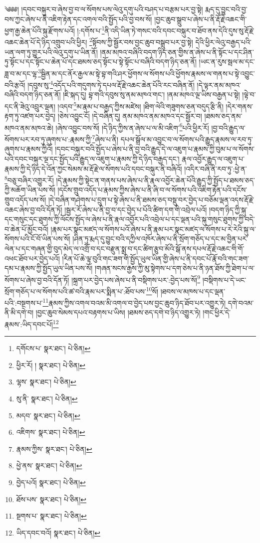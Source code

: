 \setcounter{footnote}{0} 
༄༅༅། །དབང་བསྐུར་བ་ཞེས་བྱ་བ་ལ་སོགས་པས་ལེའུ་དགུ་པའི་བཤད་པ་བརྩམ་པར་བྱ་སྟེ། རྨད་དུ་བྱུང་བའི་བྱ་བས་ཀྱང་ཞེས་པ་ནི་འཇིག་རྟེན་དང་འགལ་བའི་སྤྱོད་པའི་བྱ་བས་སོ། །བྱང་ཆུབ་སྒྲུབ་པ་ཞེས་པ་ནི་རྡོ་རྗེ་འཆང་གི་ཕྱག་རྒྱ་ཆེན་པོའི་སྐུ་རྫོགས་པའོ། །:དགོས་པ་\footnote{དགོངས་པ་  སྣར་ཐང་།  པེ་ཅིན། }ནི་འདི་ཡིན་ཏེ་གསང་བའི་དབང་བསྐུར་བ་ཐོབ་ནས་དེའི་དུས་སུ་རྡོ་རྗེ་འཆང་ཆེན་པོ་དེ་ཉིད་འགྲུབ་པའི་ཕྱིར། \footnote{ཕྱིར་རོ། །   སྣར་ཐང་།  པེ་ཅིན། }སྟོབས་ཀྱི་སྦྱོར་བས་བྱང་ཆུབ་བསྒྲུབ་པར་བྱ་སྟེ། དེའི་ཕྱིར་ལེའུ་བརྒྱད་པའི་ཡན་ལག་ཏུ་གྱུར་པའི་ལེའུ་དགུ་པ་ཡིན་ནོ། །ནམ་མཁའ་བཞིའི་བདག་ཉིད་ཅན་གྱིས་ན་ཞེས་པ་ནི་སྟོང་པ་དང་ཤིན་ཏུ་སྟོང་པ་དང་སྟོང་པ་ཆེན་པོ་དང་ཐམས་ཅད་སྟོང་པ་སྟེ་སྟོང་པ་བཞིའི་བདག་ཉིད་ཅན་ནོ། །ཡང་ན་རུས་སྦལ་མ་དང་ཟླ་བ་མ་དང་ལྷ་\footnote{ལྷས་  སྣར་ཐང་།  པེ་ཅིན། }སྦྱིན་མ་དང་ནོར་རྒྱལ་མ་སྟེ་བྷ་གའི་ཤར་ཕྱོགས་ལ་སོགས་པའི་ཕྱོགས་རྣམས་ལ་གནས་པ་སྟེ་འབྱུང་བའི་རྩའོ། །དབུས་སུ་\footnote{སུ་ནི་  སྣར་ཐང་།  པེ་ཅིན། }འདོད་པའི་གདུགས་ཏེ་དཔལ་རྡོ་རྗེ་འཆང་ཆེན་པོའི་རང་བཞིན་ནོ། །དེ་ལྟར་ནམ་མཁའ་བཞིའི་བདག་ཉིད་ཅན་ནོ། །ཇི་སྐད་དུ། བྷ་གའི་དབུས་སུ་ནམ་མཁའ་གང་། །ནམ་མཁའ་ལྔ་ཡིས་བརྒྱན་པ་སྟེ། །ལྟེ་བ་དང་ནི་ཟེའུ་འབྲུར་ལྡན། །འདབ་\footnote{མདབ་  སྣར་ཐང་།  པེ་ཅིན། }མ་རྣམ་པ་བརྒྱད་ཀྱིས་མཛེས། །ཐིག་ལེའི་གཟུགས་ཅན་བདུད་རྩི་ནི། །དེར་གནས་རྟག་ཏུ་འཛག་པར་བྱེད། །ཅེས་འབྱུང་ངོ། །དེ་བཞིན་དུ། ནམ་མཁའ་ནམ་མཁའ་དང་སྦྱོར་བ། །ཐམས་ཅད་ནམ་མཁའ་ནམ་མཁའ་ཆེ། །ཞེས་འབྱུང་བས་སོ། །དེ་ཉིད་ཀྱིས་ན་ཞེས་པ་ལ་མི་འཇིག་\footnote{འཇིགས་  སྣར་ཐང་།  པེ་ཅིན། }པའི་ཕྱིར་རོ། །བྱ་བའི་རྒྱུད་ལ་སོགས་པར་རབ་ཏུ་ཞུགས་པ་:རྣམས་ཀྱི་\footnote{རྣམས་ཀྱིས་  སྣར་ཐང་།  པེ་ཅིན། }ཞེས་པ་ནི། དཔལ་སྒྲོལ་མ་འབྱུང་བ་ལ་སོགས་པའི་རྒྱུད་རྣམས་ལ་རབ་ཏུ་ཞུགས་པ་རྣམས་ཀྱིའོ། །དབང་བསྐུར་བའི་སྤྱོད་པ་ཞེས་པ་ནི་བྱ་བའི་རྒྱུད་དེ་ལ་འཇུག་པ་རྣམས་ཀྱི་བུམ་པ་ལ་སོགས་པའི་དབང་བསྐུར་ལྔ་དང་སྤྱོད་པའི་རྒྱུད་ལ་འཇུག་པ་རྣམས་ཀྱི་དེ་ཉིད་བརྒྱད་དང་། རྣལ་འབྱོར་རྒྱུད་ལ་འཇུག་པ་རྣམས་ཀྱི་དེ་ཉིད་དེ་འོན་ཀྱང་སེམས་མ་རྡོ་རྗེ་ལ་སོགས་པའི་དབང་བསྐུར་ནི་བཞིའོ། །འདིར་བཞི་ནི་རབ་ཏུ་:ཕྱེ་ན་\footnote{ཕྱེ་ནས་  སྣར་ཐང་།  པེ་ཅིན། }བཅུ་བཞིར་འགྱུར་རོ། །དེ་རྣམས་ཀྱི་སྟེང་ན་གནས་པས་ཞེས་པ་ནི་རྣལ་འབྱོར་ཆེན་པོའི་རྒྱུད་ཀྱི་སྤྱོད་པ་ཐམས་ཅད་ཀྱི་མཆོག་ཡིན་པས་སོ། །དངོས་གྲུབ་འདོད་པ་རྣམས་ཀྱིས་ཞེས་པ་ནི་ཞི་བ་ལ་སོགས་པའི་འཇིག་རྟེན་པའི་དངོས་གྲུབ་འདོད་པས་སོ། །དེ་བཞིན་གཤེགས་པ་དྲུག་པ་སྟེ་ཞེས་པ་ནི་ཐམས་ཅད་བསྡུ་བར་བྱེད་པ་བཅོམ་ལྡན་འདས་རྡོ་རྗེ་འཆང་ཞེས་བྱ་བའི་དོན་ཏོ། །སྦྱར་རོ་ཞེས་པ་ནི་བྱ་བ་དང་བྱེད་པ་པོའི་ཚིག་དག་གི་འབྲེལ་པའོ། །བདག་ཉིད་ཀྱི་སྐུ་དང་གསུང་དང་ཐུགས་ཀྱི་ལོངས་སྤྱོད་ལ་ཞེས་པ་ནི་རྣལ་འབྱོར་པའི་འབྲེལ་པ་དང་ལྡན་པའི་སྐུ་གསུང་ཐུགས་ཀྱི་བདེ་བ་ཆེན་པོ་མྱོང་བའོ། །རྣམ་པར་སྣང་མཛད་ལ་སོགས་པའོ་ཞེས་པ་ནི་རྣམ་པར་སྣང་མཛད་ལ་སོགས་པ་རེ་རེའི་སྐུ་ལ་སོགས་པའི་ངོ་བོ་ཡིན་པས་སོ། །ཤིན་ཏུ་རྨད་དུ་བྱུང་བའི་དཀྱིལ་འཁོར་ཞེས་པ་ནི་སྲོག་གཅོད་པ་དང་མ་བྱིན་པར་ལེན་པ་དང་གཞན་གྱི་བུད་མེད་ལ་འགྲོ་བ་དང་བརྫུན་སྨྲ་བ་དང་ཚིག་རྩུབ་མོའི་སྒོ་ནས་དཔལ་རྡོ་རྗེ་འཆང་གི་གོ་འཕང་ཐོབ་པར་བྱེད་པའོ། །རིན་པོ་ཆེ་ལྟ་བུའི་གང་ཟག་གི་སྤྱོད་ཡུལ་ཡིན་གྱི་ཞེས་པ་ནི་དབང་པོ་རྣོ་བའི་གང་ཟག་དམ་པ་རྣམས་ཀྱི་སྤྱོད་ཡུལ་ཡིན་པས་སོ། །གཞན་སངས་རྒྱས་ཀྱི་མུ་སྟེགས་པ་དག་ཅེས་པ་ནི་ཉན་ཐོས་ཀྱི་ཐེག་པ་ལ་སོགས་པ་ཞེས་བྱ་བའི་དོན་ཏོ། །སྐྲག་པར་བྱེད་པས་ཞེས་པ་ནི་བསྡིགས་པར་:བྱེད་པས་སོ།\footnote{བྱེད་པའོ།  སྣར་ཐང་།  པེ་ཅིན། } །བསྡིགས་པ་དེ་ཡང་སྲོག་གཅོད་པ་ལ་སོགས་པའི་ཚ་བའི་རྣམ་པར་སྨིན་པ་:ཐོབ་པས་\footnote{ཐོས་པས་  སྣར་ཐང་།  པེ་ཅིན། }སོ། །ཐབས་ལ་མཁས་པ་དང་ལྡན་པའི་:བསྔགས་པ་\footnote{སྔགས་པ་  སྣར་ཐང་།  པེ་ཅིན། }རྣམས་ཀྱིས་འགལ་བའམ་མི་འགལ་བ་བྱེད་པས་བྱང་ཆུབ་ཉིད་ཐོབ་པར་འགྱུར་ཏེ། དགེ་བའམ་ནི་མི་དགེ་བ། །བྱང་ཆུབ་སེམས་དཔའ་བརྟགས་པ་ཡིས། །ཐམས་ཅད་དགེ་བ་ཉིད་འགྱུར་ཏེ། །གང་ཕྱིར་དེ་རྣམས་:ཡིད་དབང་པོ།\footnote{ཡིད་དབང་བའོ།  སྣར་ཐང་།  པེ་ཅིན། } 